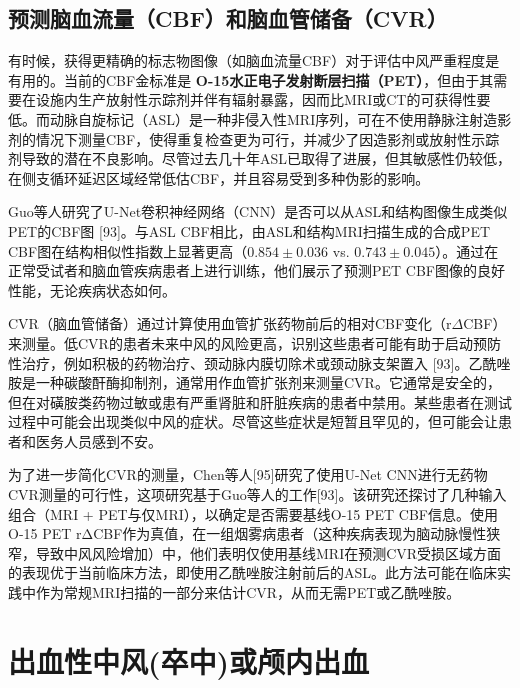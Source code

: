 \documentclass[11pt]{article}
\begin{document}
\subsection{\kaishu 预测脑血流量（CBF）和脑血管储备（CVR）}

有时候，获得更精确的标志物图像（如脑血流量CBF）对于评估中风严重程度是有用的。当前的CBF金标准是 \textbf{O-15水正电子发射断层扫描（PET）}，但由于其需要在设施内生产放射性示踪剂并伴有辐射暴露，因而比MRI或CT的可获得性要低。而动脉自旋标记（ASL）是一种非侵入性MRI序列，可在不使用静脉注射造影剂的情况下测量CBF，使得重复检查更为可行，并减少了因造影剂或放射性示踪剂导致的潜在不良影响。尽管过去几十年ASL已取得了进展，但其敏感性仍较低，在侧支循环延迟区域经常低估CBF，并且容易受到多种伪影的影响。

Guo等人研究了U-Net卷积神经网络（CNN）是否可以从ASL和结构图像生成类似PET的CBF图 [93]。与ASL CBF相比，由ASL和结构MRI扫描生成的合成PET CBF图在结构相似性指数上显著更高（$0.854 \pm 0.036$ vs. $0.743 \pm 0.045$）。通过在正常受试者和脑血管疾病患者上进行训练，他们展示了预测PET CBF图像的良好性能，无论疾病状态如何。

CVR（脑血管储备）通过计算使用血管扩张药物前后的相对CBF变化（r$\Delta$CBF）来测量。低CVR的患者未来中风的风险更高，识别这些患者可能有助于启动预防性治疗，例如积极的药物治疗、颈动脉内膜切除术或颈动脉支架置入 [93]。乙酰唑胺是一种碳酸酐酶抑制剂，通常用作血管扩张剂来测量CVR。它通常是安全的，但在对磺胺类药物过敏或患有严重肾脏和肝脏疾病的患者中禁用。某些患者在测试过程中可能会出现类似中风的症状。尽管这些症状是短暂且罕见的，但可能会让患者和医务人员感到不安。

为了进一步简化CVR的测量，Chen等人[95]研究了使用U-Net CNN进行无药物CVR测量的可行性，这项研究基于Guo等人的工作[93]。该研究还探讨了几种输入组合（MRI + PET与仅MRI），以确定是否需要基线O-15 PET CBF信息。使用O-15 PET rΔCBF作为真值，在一组烟雾病患者（这种疾病表现为脑动脉慢性狭窄，导致中风风险增加）中，他们表明仅使用基线MRI在预测CVR受损区域方面的表现优于当前临床方法，即使用乙酰唑胺注射前后的ASL。此方法可能在临床实践中作为常规MRI扫描的一部分来估计CVR，从而无需PET或乙酰唑胺。


\section{\kaishu 出血性中风(卒中)或颅内出血}
\end{document}
